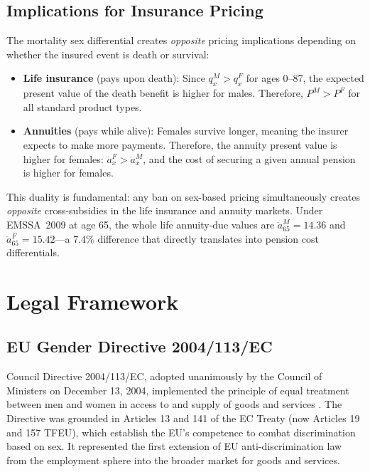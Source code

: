 \documentclass[12pt,a4paper]{article}
\newcommand{\qx}[1]{q_{#1}}
\newcommand{\ax}[1]{\ddot{a}_{#1}}
\begin{document}
\subsection{Implications for Insurance Pricing}

The mortality sex differential creates \emph{opposite} pricing implications
depending on whether the insured event is death or survival:

\begin{itemize}
  \item \textbf{Life insurance} (pays upon death): Since $\qx{x}^M > \qx{x}^F$
        for ages 0--87, the expected present value of the death benefit is higher
        for males. Therefore, $P^M > P^F$ for all standard product types.
  \item \textbf{Annuities} (pays while alive): Females survive longer, meaning
        the insurer expects to make more payments. Therefore, the annuity present
        value is higher for females: $\ax{x}^F > \ax{x}^M$, and the cost of
        securing a given annual pension is higher for females.
\end{itemize}

This duality is fundamental: any ban on sex-based pricing simultaneously creates
\emph{opposite} cross-subsidies in the life insurance and annuity markets.
Under EMSSA~2009 at age 65, the whole life annuity-due values are
$\ax{65}^M = 14.36$ and $\ax{65}^F = 15.42$---a 7.4\% difference that directly
translates into pension cost differentials.


\section{Legal Framework}
\label{sec:legal}

\subsection{EU Gender Directive 2004/113/EC}
\label{subsec:directive}

Council Directive 2004/113/EC, adopted unanimously by the Council of Ministers on December 13, 2004, implemented the principle of equal treatment between men and women in access to and supply of goods and services \cite{directive2004}. The Directive was grounded in Articles 13 and 141 of the EC Treaty (now Articles 19 and 157 TFEU), which establish the EU's competence to combat discrimination based on sex. It represented the first extension of EU anti-discrimination law from the employment sphere into the broader market for goods and services.
\end{document}
